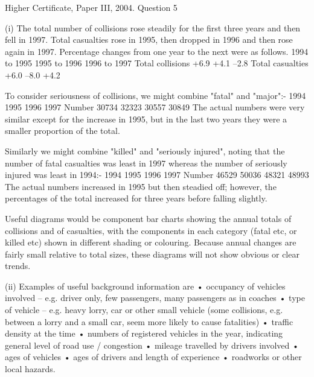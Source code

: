 \documentclass[a4paper,12pt]{article}
\begin{document}
Higher Certificate, Paper III, 2004.  Question 5 
 
 
(i) The total number of collisions rose steadily for the first three years and then fell in 1997.  Total casualties rose in 1995, then dropped in 1996 and then rose again in 1997.  Percentage changes from one year to the next were as follows. 
  1994 to 1995 1995 to 1996 1996 to 1997 Total collisions +6.9 +4.1 –2.8 Total casualties +6.0 –8.0 +4.2 
 
To consider seriousness of collisions, we might combine "fatal" and "major":- 
  1994 1995 1996 1997 Number 30734 32323 30557 30849 %
 The actual numbers were very similar except for the increase in 1995, but in the last two years they were a smaller proportion of the total. 
 
Similarly we might combine "killed" and "seriously injured", noting that the number of fatal casualties was least in 1997 whereas the number of seriously injured was least in 1994:- 
  1994 1995 1996 1997 Number 46529 50036 48321 48993 %
 The actual numbers increased in 1995 but then steadied off;  however, the percentages of the total increased for three years before falling slightly. 
 
Useful diagrams would be component bar charts showing the annual totals of collisions and of casualties, with the components in each category (fatal etc, or killed etc) shown in different shading or colouring.  Because annual changes are fairly small relative to total sizes, these diagrams will not show obvious or clear trends. 
 
 
(ii) Examples of useful background information are 
 • occupancy of vehicles involved – e.g. driver only, few passengers, many passengers as in coaches • type of vehicle – e.g. heavy lorry, car or other small vehicle (some collisions, e.g. between a lorry and a small car, seem more likely to cause fatalities) • traffic density at the time • numbers of registered vehicles in the year, indicating general level of road use / congestion • mileage travelled by drivers involved • ages of vehicles • ages of drivers and length of experience • roadworks or other local hazards. 
 
\end{document}
